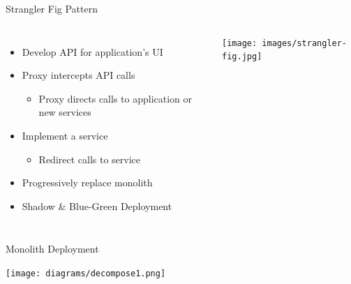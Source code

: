 \documentclass{slide}
\begin{document}
\begin{frame}{Strangler Fig Pattern \cite{fowler-strangler-fig}}
    \vspace{1pt}
    \begin{columns}
      {\LARGE
        \begin{itemize}[<+(1)->]
            \item Develop API for application's UI
            \vspace{2mm}
            \item Proxy intercepts API calls
            \begin{itemize}[<3->]
                \Large\item Proxy directs calls to application or new services
            \end{itemize}
            \vspace{2mm}
            \item Implement a service
            \begin{itemize}[<4->]
                \Large\item Redirect calls to service
            \end{itemize}
            \item Progressively replace monolith
            \item Shadow \& Blue-Green Deployment
        \end{itemize}
      }
        \centering
        \texttt{[image: images/strangler-fig.jpg]}
    \end{columns}
\end{frame}



\begin{frame}{Monolith Deployment}
    \begin{adjustwidth}{-12mm}{-12mm}
        \centering
        \texttt{[image: diagrams/decompose1.png]}
    \end{adjustwidth}
\end{frame}
\end{document}
